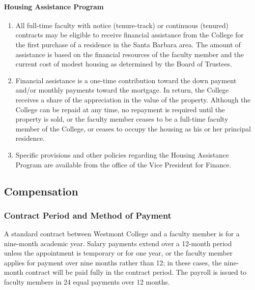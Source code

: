 			\paragraph{Housing Assistance Program}
				\begin{enumerate}[label=\alph*)]

					\item{All full-time faculty with notice (tenure-track) or continuous
						(tenured) contracts may be eligible to receive financial assistance from the
						College for the first purchase of a residence in the Santa Barbara area.
						The amount of assistance is based on the financial resources of the faculty
						member and the current cost of modest housing as determined by the Board of
						Trustees.}

					\item{Financial assistance is a one-time contribution toward the down
						payment and/or monthly payments toward the mortgage.  In return, the
						College receives a share of the appreciation in the value of the
						property.  Although the College can be repaid at any time, no repayment
						is required until the property is sold, or the faculty member ceases to
						be a full-time faculty member of the College, or ceases to occupy the
						housing as his or her principal residence.}

					\item{Specific provisions and other policies regarding the Housing
						Assistance Program are available from the office of the Vice
						President for Finance.}

				\end{enumerate}

	\subsection{Compensation}
		\subsubsection{Contract Period and Method of Payment}
			A standard contract between Westmont College and a faculty member is for a nine-month academic year.  Salary payments extend over a 12-month period unless the appointment is temporary or for one year, or the faculty member applies for payment over nine months rather than 12; in these cases, the nine-month contract will be paid fully in the contract period.  The payroll is issued to faculty members in 24 equal payments over 12 months.
